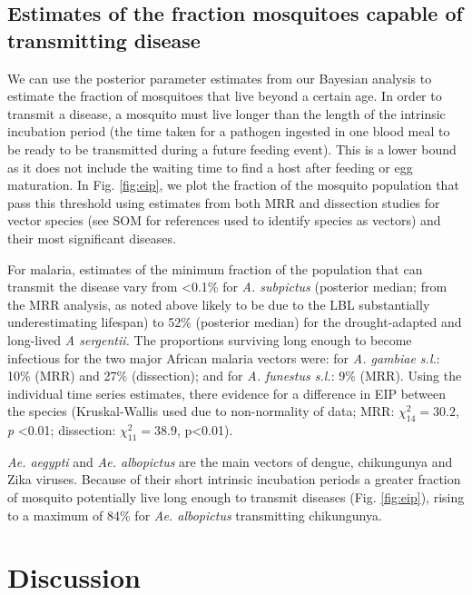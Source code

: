 \documentclass[]{article}
\begin{document}
\subsection{Estimates of the fraction mosquitoes capable of transmitting
disease}\label{estimates-of-the-fraction-mosquitoes-capable-of-transmitting-disease}

We can use the posterior parameter estimates from our Bayesian analysis
to estimate the fraction of mosquitoes that live beyond a certain age.
In order to transmit a disease, a mosquito must live longer than the
length of the intrinsic incubation period (the time taken for a pathogen
ingested in one blood meal to be ready to be transmitted during a future
feeding event). This is a lower bound as it does not include the waiting
time to find a host after feeding or egg maturation. In Fig. \ref{fig:eip}, we plot
the fraction of the mosquito population that pass this threshold using
estimates from both MRR and dissection studies for vector species (see
SOM for references used to identify species as vectors) and their most
significant diseases.

For malaria, estimates of the minimum fraction of the population that
can transmit the disease vary from \textless{}0.1\% for \emph{A.
subpictus} (posterior median; from the MRR analysis, as noted above likely to be due to
the LBL substantially underestimating lifespan) to 52\% (posterior median) for the
drought-adapted and long-lived \emph{A sergentii.} The proportions
surviving long enough to become infectious for the two major African
malaria vectors were: for \emph{A. gambiae s.l.}: 10\% (MRR) and 27\%
(dissection); and for \emph{A. funestus s.l.}: 9\% (MRR). Using the
individual time series estimates, there
evidence for a difference in EIP between the species (Kruskal-Wallis used due to non-normality of data; MRR:
\(\chi_{14}^{2} = 30.2\), \emph{p} \textless{}0.01; dissection: \(\chi_{11}^{2} = 38.9\), p\textless{}0.01).

\emph{Ae. aegypti} and \emph{Ae. albopictus} are the main vectors of
dengue, chikungunya and Zika viruses. Because of their short intrinsic
incubation periods a greater fraction of mosquito potentially live long
enough to transmit diseases (Fig. \ref{fig:eip}), rising to a maximum of 84\% for
\emph{Ae. albopictus} transmitting chikungunya.

\section{Discussion}\label{discussion}
\end{document}
